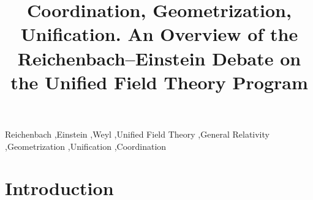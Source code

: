 \documentclass[draft]{article}
\title{Coordination, Geometrization, Unification. An Overview of the Reichenbach--Einstein Debate on the Unified Field Theory Program}
\begin{document}
\maketitle

\begin{abstract}
\lipsum*[1-2]
\end{abstract}


\begin{keywords}
Reichenbach \sep Einstein \sep Weyl \sep Unified Field Theory \sep General Relativity \sep Geometrization \sep Unification \sep Coordination	
\end{keywords}

\section*{Introduction}

\lipsum[1]
\end{document}
